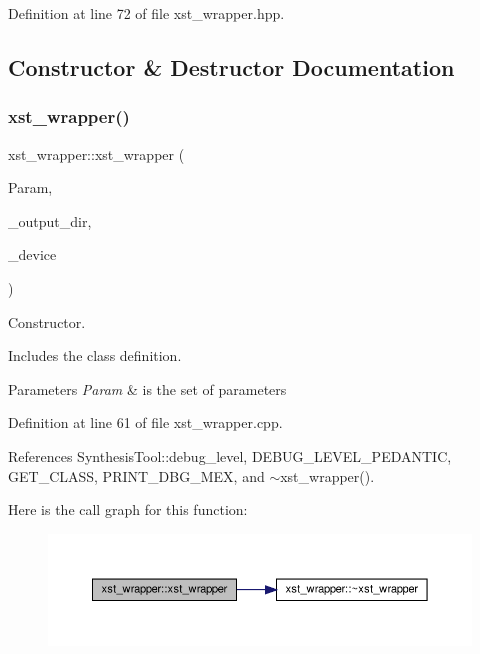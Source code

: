 Definition at line 72 of file xst\+\_\+wrapper.\+hpp.



\subsection{Constructor \& Destructor Documentation}
\mbox{\label{classxst__wrapper_abfb651706b55e67022547c9ecafd39a5}} 
\subsubsection{\texorpdfstring{xst\+\_\+wrapper()}{xst\_wrapper()}}
{\footnotesize\ttfamily xst\+\_\+wrapper\+::xst\+\_\+wrapper (\begin{DoxyParamCaption}\item[{const \hyperlink{Parameter_8hpp_a37841774a6fcb479b597fdf8955eb4ea}{Parameter\+Const\+Ref} \&}]{Param,  }\item[{const std\+::string \&}]{\+\_\+output\+\_\+dir,  }\item[{const \hyperlink{target__device_8hpp_acedb2b7a617e27e6354a8049fee44eda}{target\+\_\+device\+Ref} \&}]{\+\_\+device }\end{DoxyParamCaption})}



Constructor. 

Includes the class definition.


\begin{DoxyParams}{Parameters}
{\em Param} & is the set of parameters \\
\hline
\end{DoxyParams}


Definition at line 61 of file xst\+\_\+wrapper.\+cpp.



References Synthesis\+Tool\+::debug\+\_\+level, D\+E\+B\+U\+G\+\_\+\+L\+E\+V\+E\+L\+\_\+\+P\+E\+D\+A\+N\+T\+IC, G\+E\+T\+\_\+\+C\+L\+A\+SS, P\+R\+I\+N\+T\+\_\+\+D\+B\+G\+\_\+\+M\+EX, and $\sim$xst\+\_\+wrapper().

Here is the call graph for this function\+:
\nopagebreak
\begin{figure}[H]
\begin{center}
\leavevmode
\includegraphics[width=350pt]{d8/dd6/classxst__wrapper_abfb651706b55e67022547c9ecafd39a5_cgraph}
\end{center}
\end{figure}
\mbox{\label{classxst__wrapper_a27480802ccb070027ca10f43f3777a2b}} 
